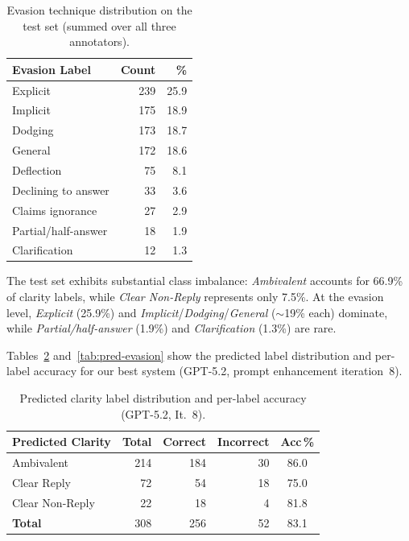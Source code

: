 \documentclass[11pt]{article}
\begin{document}
\begin{table}[H]
\centering
\small
\begin{tabular}{@{}lrr@{}}
\toprule
\textbf{Evasion Label} & \textbf{Count} & \textbf{\%} \\
\midrule
Explicit & 239 & 25.9 \\
Implicit & 175 & 18.9 \\
Dodging & 173 & 18.7 \\
General & 172 & 18.6 \\
Deflection & 75 & 8.1 \\
Declining to answer & 33 & 3.6 \\
Claims ignorance & 27 & 2.9 \\
Partial/half-answer & 18 & 1.9 \\
Clarification & 12 & 1.3 \\
\bottomrule
\end{tabular}
\caption{Evasion technique distribution on the test set (summed over all three annotators).}
\label{tab:evasion-dist}
\end{table}

The test set exhibits substantial class imbalance: \emph{Ambivalent} accounts for 66.9\% of clarity labels, while \emph{Clear Non-Reply} represents only 7.5\%.
At the evasion level, \emph{Explicit} (25.9\%) and \emph{Implicit}/\emph{Dodging}/\emph{General} (${\sim}$19\% each) dominate, while \emph{Partial/half-answer} (1.9\%) and \emph{Clarification} (1.3\%) are rare.

Tables~\ref{tab:pred-clarity} and~\ref{tab:pred-evasion} show the predicted label distribution and per-label accuracy for our best system (GPT-5.2, prompt enhancement iteration~8).

\begin{table}[H]
\centering
\small
\begin{tabular}{@{}lrrrc@{}}
\toprule
\textbf{Predicted Clarity} & \textbf{Total} & \textbf{Correct} & \textbf{Incorrect} & \textbf{Acc\,\%} \\
\midrule
Ambivalent & 214 & 184 & 30 & 86.0 \\
Clear Reply & 72 & 54 & 18 & 75.0 \\
Clear Non-Reply & 22 & 18 & 4 & 81.8 \\
\midrule
\textbf{Total} & 308 & 256 & 52 & 83.1 \\
\bottomrule
\end{tabular}
\caption{Predicted clarity label distribution and per-label accuracy (GPT-5.2, It.~8).}
\label{tab:pred-clarity}
\end{table}
\end{document}
